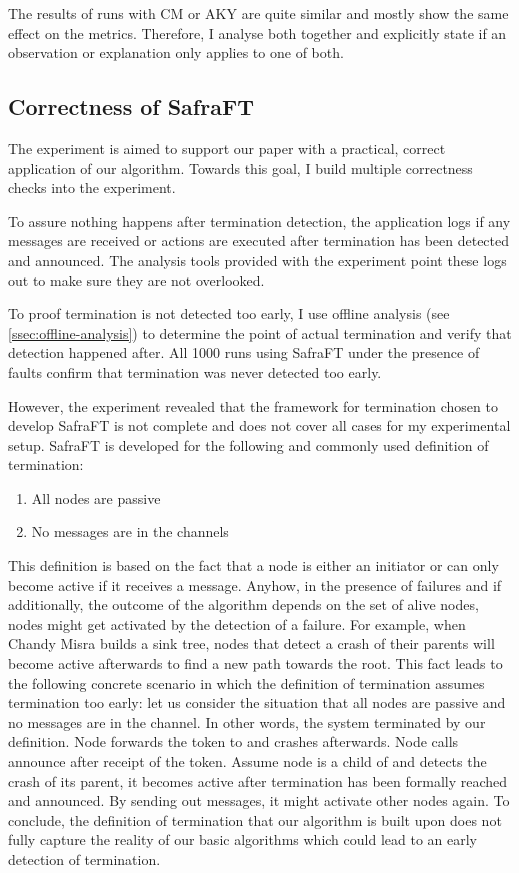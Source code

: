 The results of runs with CM or AKY are quite similar and mostly show the same effect on the metrics.
Therefore, I analyse both together and explicitly state if an observation or explanation only applies to one of both.

\subsection{Correctness of SafraFT}
\label{ssec:correctness}
The experiment is aimed to support our paper with a practical, correct application of our algorithm.
Towards this goal, I build multiple correctness checks into the experiment. 

To assure nothing happens after termination detection, the application logs if any messages are received or actions are executed after termination has been detected and announced. 
The analysis tools provided with the experiment point these logs out to make sure they are not overlooked.

To proof termination is not detected too early, I use offline analysis (see \cref{ssec:offline-analysis}) to determine the point of actual termination and verify that detection happened after.
All 1000 runs using SafraFT under the presence of faults confirm that termination was never detected too early.

However, the experiment revealed that the framework for termination chosen to develop SafraFT is not complete and does not cover all cases for my experimental setup.
SafraFT is developed for the following and commonly used definition of termination:
\begin{enumerate}
	\item All nodes are passive
	\item No messages are in the channels
\end{enumerate}
This definition is based on the fact that a node is either an initiator or can only become active if it receives a message. 
Anyhow, in the presence of failures and if additionally, the outcome of the algorithm depends on the set of alive nodes, nodes might get activated by the detection of a failure.
For example, when Chandy Misra builds a sink tree, nodes that detect a crash of their parents will become active afterwards to find a new path towards the root.
This fact leads to the following concrete scenario in which the definition of termination assumes termination too early: let us consider the situation that all nodes are passive and no messages are in the channel. 
In other words, the system terminated by our definition.
Node  forwards the token to  and crashes afterwards. 
Node  calls announce after receipt of the token.
Assume node  is a child of  and detects the crash of its parent, it becomes active after termination has been formally reached and announced.
By sending out  messages, it might activate other nodes again.
To conclude, the definition of termination that our algorithm is built upon does not fully capture the reality of our basic algorithms which could lead to an early detection of termination.

